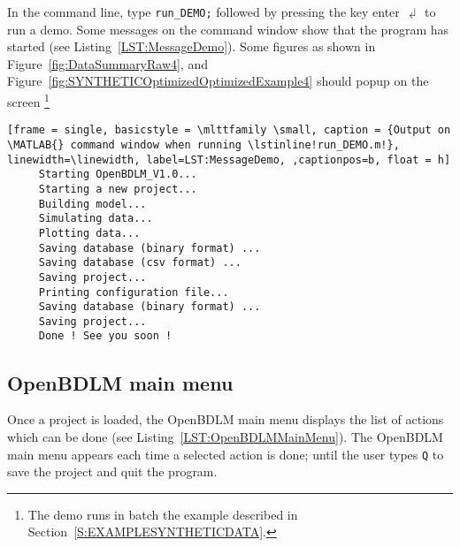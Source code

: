 In the \MATLAB{} command line, type  
\colorbox{light-gray}{\lstinline[basicstyle = \mlttfamily \small, backgroundcolor = \color{light-gray}]!run_DEMO;! }
 followed by pressing the key enter $\dlsh$ to run a demo. 
Some messages on the \MATLAB{} command window show that the program has started (see Listing~\ref{LST:MessageDemo}).
Some figures as shown in Figure~\ref{fig:DataSummaryRaw4}, and Figure~\ref{fig:SYNTHETICOptimizedOptimizedExample4} should popup on the screen \footnote{The demo runs in batch the example described in Section~\ref{S:EXAMPLESYNTHETICDATA}.}


\begin{lstlisting}[frame = single, basicstyle = \mlttfamily \small, caption = {Output on \MATLAB{} command window when running \lstinline!run_DEMO.m!}, linewidth=\linewidth, label=LST:MessageDemo, ,captionpos=b, float = h] 
     Starting OpenBDLM_V1.0...
     Starting a new project...
     Building model...
     Simulating data...
     Plotting data...
     Saving database (binary format) ...
     Saving database (csv format) ...
     Saving project...
     Printing configuration file...
     Saving database (binary format) ...
     Saving project...
     Done ! See you soon !
\end{lstlisting}



\subsection{OpenBDLM main menu}
\label{S:OPENBDLMMAINMENU}

Once a project is loaded, the OpenBDLM main menu displays the list of actions which can be done (see Listing~\ref{LST:OpenBDLMMainMenu}). 
The OpenBDLM main menu appears each time a selected action is done; until the user types \colorbox{light-gray}{\lstinline[basicstyle = \mlttfamily \small ]!Q!} to save the project and quit the program.


